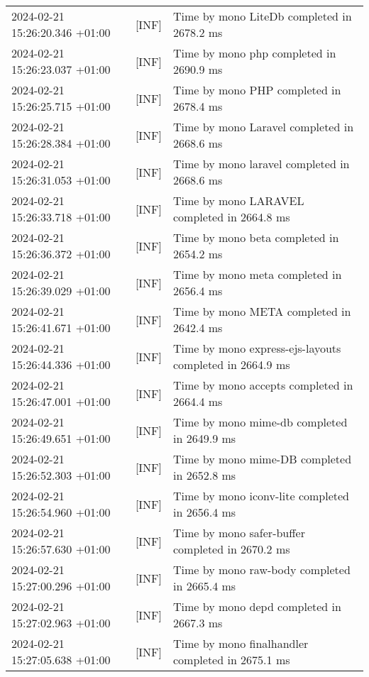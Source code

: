 {{\begin{tabularx}{\textwidth}{|l|l|X|}
                    2024-02-21 15:26:20.346 +01:00 & [INF] & Time by mono LiteDb completed in 2678.2 ms \\
                    2024-02-21 15:26:23.037 +01:00 & [INF] & Time by mono php completed in 2690.9 ms \\
                    2024-02-21 15:26:25.715 +01:00 & [INF] & Time by mono PHP completed in 2678.4 ms \\
                    2024-02-21 15:26:28.384 +01:00 & [INF] & Time by mono Laravel completed in 2668.6 ms \\
                    2024-02-21 15:26:31.053 +01:00 & [INF] & Time by mono laravel completed in 2668.6 ms \\
                    2024-02-21 15:26:33.718 +01:00 & [INF] & Time by mono LARAVEL completed in 2664.8 ms \\
                    2024-02-21 15:26:36.372 +01:00 & [INF] & Time by mono beta completed in 2654.2 ms \\
                    2024-02-21 15:26:39.029 +01:00 & [INF] & Time by mono meta completed in 2656.4 ms \\
                    2024-02-21 15:26:41.671 +01:00 & [INF] & Time by mono META completed in 2642.4 ms \\
                    2024-02-21 15:26:44.336 +01:00 & [INF] & Time by mono express-ejs-layouts completed in 2664.9 ms \\
                    2024-02-21 15:26:47.001 +01:00 & [INF] & Time by mono accepts completed in 2664.4 ms \\
                    2024-02-21 15:26:49.651 +01:00 & [INF] & Time by mono mime-db completed in 2649.9 ms \\
                    2024-02-21 15:26:52.303 +01:00 & [INF] & Time by mono mime-DB completed in 2652.8 ms \\
                    2024-02-21 15:26:54.960 +01:00 & [INF] & Time by mono iconv-lite completed in 2656.4 ms \\
                    2024-02-21 15:26:57.630 +01:00 & [INF] & Time by mono safer-buffer completed in 2670.2 ms \\
                    2024-02-21 15:27:00.296 +01:00 & [INF] & Time by mono raw-body completed in 2665.4 ms \\
                    2024-02-21 15:27:02.963 +01:00 & [INF] & Time by mono depd completed in 2667.3 ms \\
                    2024-02-21 15:27:05.638 +01:00 & [INF] & Time by mono finalhandler completed in 2675.1 ms \\

\end{tabularx}}}
